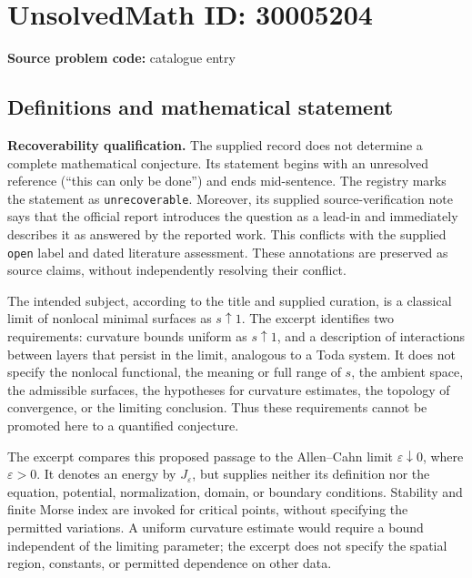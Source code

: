 \documentclass[11pt]{article}
\begin{document}
\section*{UnsolvedMath ID: 30005204}
\textbf{Source problem code:} catalogue entry
\subsection{Definitions and mathematical statement}
\textbf{Recoverability qualification.} The supplied record does not determine a complete mathematical conjecture. Its statement begins with an unresolved reference (``this can only be done'') and ends mid-sentence. The registry marks the statement as \texttt{unrecoverable}. Moreover, its supplied source-verification note says that the official report introduces the question as a lead-in and immediately describes it as answered by the reported work. This conflicts with the supplied \texttt{open} label and dated literature assessment. These annotations are preserved as source claims, without independently resolving their conflict.

The intended subject, according to the title and supplied curation, is a classical limit of nonlocal minimal surfaces as \(s\uparrow 1\). The excerpt identifies two requirements: curvature bounds uniform as \(s\uparrow 1\), and a description of interactions between layers that persist in the limit, analogous to a Toda system. It does not specify the nonlocal functional, the meaning or full range of \(s\), the ambient space, the admissible surfaces, the hypotheses for curvature estimates, the topology of convergence, or the limiting conclusion. Thus these requirements cannot be promoted here to a quantified conjecture.

The excerpt compares this proposed passage to the Allen--Cahn limit \(\varepsilon\downarrow 0\), where \(\varepsilon>0\). It denotes an energy by \(J_\varepsilon\), but supplies neither its definition nor the equation, potential, normalization, domain, or boundary conditions. Stability and finite Morse index are invoked for critical points, without specifying the permitted variations. A uniform curvature estimate would require a bound independent of the limiting parameter; the excerpt does not specify the spatial region, constants, or permitted dependence on other data.
\end{document}
